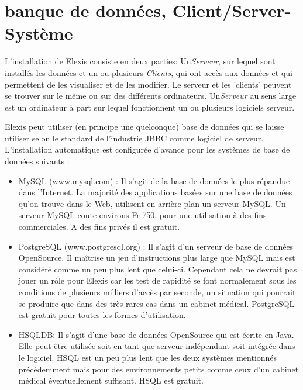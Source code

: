 
\section{banque de données, Client/Server-Système}
L'installation de Elexis consiste en deux parties: Un\textit{Serveur}, sur lequel sont installés les données et un ou plusieurs  \textit{Clients}, qui ont accès aux données et qui permettent de les visualiser et de les modifier. Le serveur et les 'clients' peuvent se trouver sur le même ou sur des différents ordinateurs.  Un\textit{\textit{Serveur}} au sens large est un ordinateur à part sur lequel fonctionnent un ou plusieurs logiciels serveur.

Elexis peut utiliser (en principe une quelconque) base de données qui se laisse utiliser selon le standard de l'industrie JBBC comme logiciel de serveur. L'installation automatique est configurée d'avance pour les systèmes de base de données suivants :
\begin{itemize}
\item MySQL (www.mysql.com) : Il s'agit de la base de données le plus répandue dans l'Internet. La majorité des applications basées sur une base de données qu'on trouve dans le Web, utilisent en arrière-plan un serveur MySQL. Un serveur MySQL coute environs Fr 750.-pour une utilisation à des fins commerciales. A des fins privés il est gratuit.

\item PostgreSQL (www.postgresql.org) : Il s'agit d'un serveur de base de données OpenSource. Il maîtrise un jeu d'instructions plus large que MySQL mais est considéré comme un peu plus lent que celui-ci. Cependant cela ne devrait pas jouer un rôle pour Elexis car les test de rapidité se font normalement sous les conditions de plusieurs milliers d'accès par seconde, un situation qui pourrait se produire que dans des très rares cas dans un cabinet médical. PostgreSQL est gratuit pour toutes les formes d'utilisation.

\item HSQLDB: Il s'agit d'une base de données OpenSource qui est écrite en Java. Elle peut être utilisée soit en tant que serveur indépendant soit intégrée dans le logiciel. HSQL est un peu plus lent que les deux systèmes mentionnés précédemment mais pour des environnements petits comme ceux d'un cabinet médical éventuellement suffisant. HSQL est gratuit.

\end{itemize}

